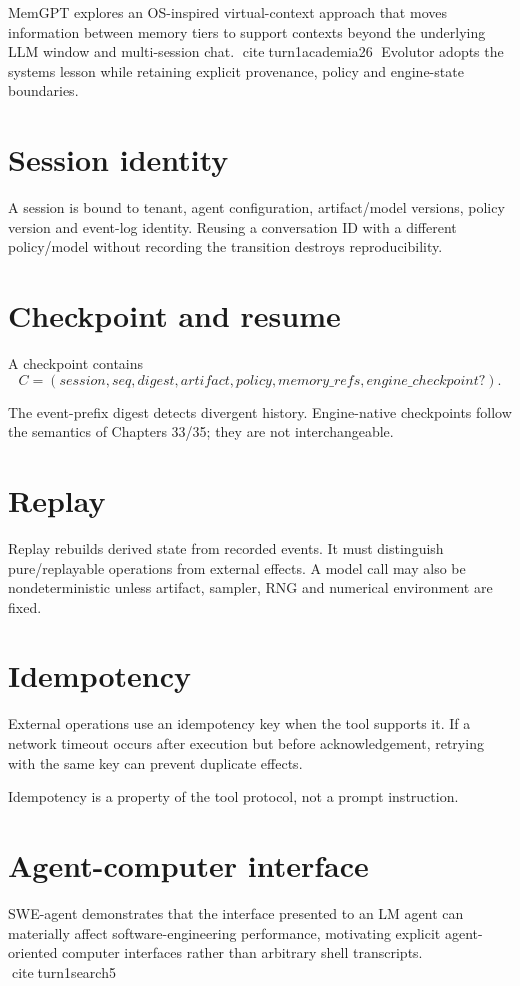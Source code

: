 MemGPT explores an OS-inspired virtual-context approach that moves information between memory tiers to support contexts beyond the underlying LLM window and multi-session chat. citeturn1academia26 Evolutor adopts the systems lesson while retaining explicit provenance, policy and engine-state boundaries.

\section{Session identity}
A session is bound to tenant, agent configuration, artifact/model versions, policy version and event-log identity. Reusing a conversation ID with a different policy/model without recording the transition destroys reproducibility.

\section{Checkpoint and resume}
A checkpoint contains
\[
C=(session,seq,digest,artifact,policy,memory\_refs,engine\_checkpoint?).
\]

The event-prefix digest detects divergent history. Engine-native checkpoints follow the semantics of Chapters 33/35; they are not interchangeable.

\section{Replay}
Replay rebuilds derived state from recorded events. It must distinguish pure/replayable operations from external effects. A model call may also be nondeterministic unless artifact, sampler, RNG and numerical environment are fixed.

\section{Idempotency}
External operations use an idempotency key when the tool supports it. If a network timeout occurs after execution but before acknowledgement, retrying with the same key can prevent duplicate effects.

Idempotency is a property of the tool protocol, not a prompt instruction.

\section{Agent-computer interface}
SWE-agent demonstrates that the interface presented to an LM agent can materially affect software-engineering performance, motivating explicit agent-oriented computer interfaces rather than arbitrary shell transcripts. citeturn1search5

